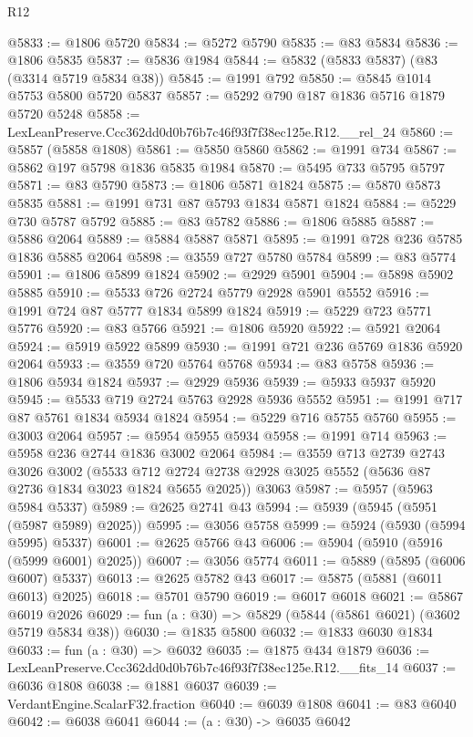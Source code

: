 \begin{lexlean}{R12}
\begin{coremodule}
@5833 := @1806 @5720
@5834 := @5272 @5790
@5835 := @83 @5834
@5836 := @1806 @5835
@5837 := @5836 @1984
@5844 := @5832 (@5833 @5837) (@83 (@3314 @5719 @5834 @38))
@5845 := @1991 @792
@5850 := @5845 @1014 @5753 @5800 @5720 @5837
@5857 := @5292 @790 @187 @1836 @5716 @1879 @5720 @5248
@5858 := LexLeanPreserve.Ccc362dd0d0b76b7c46f93f7f38ec125e.R12.__rel_24
@5860 := @5857 (@5858 @1808)
@5861 := @5850 @5860
@5862 := @1991 @734
@5867 := @5862 @197 @5798 @1836 @5835 @1984
@5870 := @5495 @733 @5795 @5797
@5871 := @83 @5790
@5873 := @1806 @5871 @1824
@5875 := @5870 @5873 @5835
@5881 := @1991 @731 @87 @5793 @1834 @5871 @1824
@5884 := @5229 @730 @5787 @5792
@5885 := @83 @5782
@5886 := @1806 @5885
@5887 := @5886 @2064
@5889 := @5884 @5887 @5871
@5895 := @1991 @728 @236 @5785 @1836 @5885 @2064
@5898 := @3559 @727 @5780 @5784
@5899 := @83 @5774
@5901 := @1806 @5899 @1824
@5902 := @2929 @5901
@5904 := @5898 @5902 @5885
@5910 := @5533 @726 @2724 @5779 @2928 @5901 @5552
@5916 := @1991 @724 @87 @5777 @1834 @5899 @1824
@5919 := @5229 @723 @5771 @5776
@5920 := @83 @5766
@5921 := @1806 @5920
@5922 := @5921 @2064
@5924 := @5919 @5922 @5899
@5930 := @1991 @721 @236 @5769 @1836 @5920 @2064
@5933 := @3559 @720 @5764 @5768
@5934 := @83 @5758
@5936 := @1806 @5934 @1824
@5937 := @2929 @5936
@5939 := @5933 @5937 @5920
@5945 := @5533 @719 @2724 @5763 @2928 @5936 @5552
@5951 := @1991 @717 @87 @5761 @1834 @5934 @1824
@5954 := @5229 @716 @5755 @5760
@5955 := @3003 @2064
@5957 := @5954 @5955 @5934
@5958 := @1991 @714
@5963 := @5958 @236 @2744 @1836 @3002 @2064
@5984 := @3559
    @713
    @2739
    @2743
    @3026
    @3002
    (@5533 @712 @2724 @2738 @2928 @3025 @5552 (@5636 @87 @2736 @1834 @3023 @1824 @5655 @2025))
    @3063
@5987 := @5957 (@5963 @5984 @5337)
@5989 := @2625 @2741 @43
@5994 := @5939 (@5945 (@5951 (@5987 @5989) @2025))
@5995 := @3056 @5758
@5999 := @5924 (@5930 (@5994 @5995) @5337)
@6001 := @2625 @5766 @43
@6006 := @5904 (@5910 (@5916 (@5999 @6001) @2025))
@6007 := @3056 @5774
@6011 := @5889 (@5895 (@6006 @6007) @5337)
@6013 := @2625 @5782 @43
@6017 := @5875 (@5881 (@6011 @6013) @2025)
@6018 := @5701 @5790
@6019 := @6017 @6018
@6021 := @5867 @6019 @2026
@6029 := fun (a : @30) => @5829 (@5844 (@5861 @6021) (@3602 @5719 @5834 @38))
@6030 := @1835 @5800
@6032 := @1833 @6030 @1834
@6033 := fun (a : @30) => @6032
@6035 := @1875 @434 @1879
@6036 := LexLeanPreserve.Ccc362dd0d0b76b7c46f93f7f38ec125e.R12.__fits_14
@6037 := @6036 @1808
@6038 := @1881 @6037
@6039 := VerdantEngine.ScalarF32.fraction
@6040 := @6039 @1808
@6041 := @83 @6040
@6042 := @6038 @6041
@6044 := (a : @30) -> @6035 @6042

\end{coremodule}
\end{lexlean}
